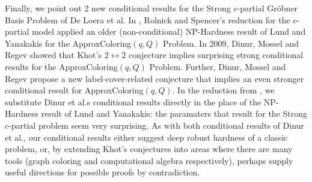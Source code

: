 \documentclass{article}
\begin{document}
Finally, we point out 2 new conditional results for the Strong $c$-partial Gr\"{o}bner Basis Problem of De Loera et al.  In \citep{RS}, Rolnick and Spencer's reduction for the $c$-partial model applied an older (non-conditional) NP-Hardness result of Lund and Yanakakis \citep{Lundyan} for the ApproxColoring$(q,Q)$ Problem.
In 2009, Dinur, Mossel and Regev \citep{dinur} showed that Khot's $2\leftrightarrow 2$ conjecture implies surprising strong conditional results for the ApproxColoring$(q,Q)$ Problem. Further, Dinur, Mossel and Regev propose a new label-cover-related conjecture that implies an even stronger conditional result for ApproxColoring$(q,Q)$. In the reduction from \citep{RS}, we substitute Dinur et al.s conditional results directly in the place of the NP-Hardness result of Lund and Yanakakis: the paramaters that result for the Strong $c$-partial problem seem very surprising. As with both conditional results of Dinur et al., our conditional results either suggest deep robust hardness of a classic problem, or, by extending Khot's conjectures into areas where there are many tools (graph coloring and computational algebra respectively), perhaps supply useful directions for possible proofs by contradiction.
\end{document}
